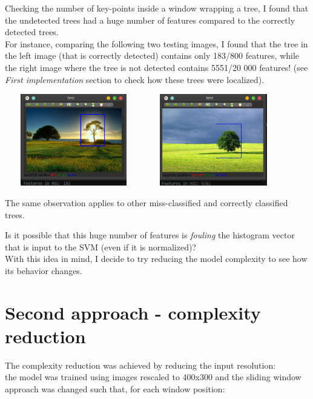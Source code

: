 \documentclass[]{report}
\begin{document}
Checking the number of key-points inside a window wrapping a tree, I found that the undetected trees had a huge number of features compared to the correctly detected trees.
\\
For instance, comparing the following two testing images, I found that the tree in the left image (that is correctly detected) contains only 183/800 features, while the right image where the tree is not detected contains 5551/20 000 features! (see \textit{First implementation} section to check how these trees were localized).
\\
\begin{center}
	\includegraphics[width=6cm,height=4cm]{img/before/no_prep_0_48_nfeat}
	\includegraphics[width=6cm,height=4cm]{img/before/no_prep_0_48_1_n_feature}
\end{center}

The same observation applies to other miss-classified and correctly classified trees.

Is it possible that this huge number of features is \textit{fouling} the histogram vector that is input to the SVM (even if it is normalized)?
\\
With this idea in mind, I decide to try reducing the model complexity to see how its behavior changes.

\section{Second approach - complexity reduction}
The complexity reduction was achieved by reducing the input resolution:
\\
the model was trained using images rescaled to 400x300 and the sliding window approach was changed such that, for each window position:
\end{document}
